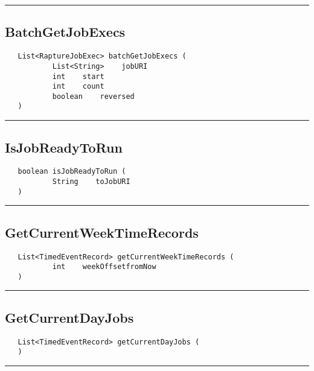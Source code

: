 \rule{15cm}{2pt}
\subsection{BatchGetJobExecs}
\label{Api:BatchGetJobExecs}
\begin{verbatim}
   List<RaptureJobExec> batchGetJobExecs (
           List<String>    jobURI
           int    start
           int    count
           boolean    reversed
   )
\end{verbatim}



\rule{15cm}{2pt}
\subsection{IsJobReadyToRun}
\label{Api:IsJobReadyToRun}
\begin{verbatim}
   boolean isJobReadyToRun (
           String    toJobURI
   )
\end{verbatim}



\rule{15cm}{2pt}
\subsection{GetCurrentWeekTimeRecords}
\label{Api:GetCurrentWeekTimeRecords}
\begin{verbatim}
   List<TimedEventRecord> getCurrentWeekTimeRecords (
           int    weekOffsetfromNow
   )
\end{verbatim}



\rule{15cm}{2pt}
\subsection{GetCurrentDayJobs}
\label{Api:GetCurrentDayJobs}
\begin{verbatim}
   List<TimedEventRecord> getCurrentDayJobs (
   )
\end{verbatim}



\rule{15cm}{2pt}
